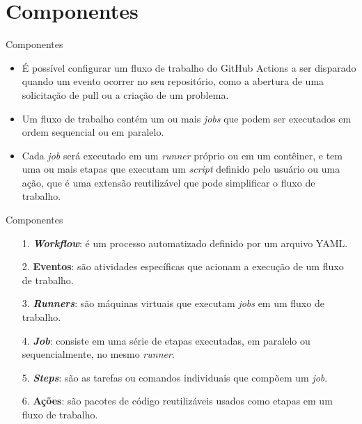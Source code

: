 \documentclass[t,serif]{beamer}
\begin{document}
\section{Componentes}
	\begin{frame}{Componentes}
		\vspace{0.5cm}
		\begin{itemize}
			\item É possível configurar um fluxo de trabalho do GitHub Actions a ser disparado quando um evento ocorrer no seu repositório, como a abertura de uma solicitação de pull ou a criação de um problema.
			\vspace{0.5cm}
			\item Um fluxo de trabalho contém um ou mais \textit{jobs} que podem ser executados em ordem sequencial ou em paralelo.
			\vspace{0.5cm}
			\item Cada \textit{job} será executado em um \textit{runner} próprio ou em um contêiner, e tem uma ou mais etapas que executam um \textit{script} definido pelo usuário ou uma ação, que é uma extensão reutilizável que pode simplificar o fluxo de trabalho.
		\end{itemize}
	\end{frame}
	
	\begin{frame}{Componentes}
		\begin{enumerate}
			\item[1.] \textbf{\textit{Workflow}}: é um processo automatizado definido por um arquivo YAML.
			\item[2.] \textbf{Eventos}: são atividades específicas que acionam a execução de um fluxo de trabalho.
			\item[3.] \textbf{\textit{Runners}}: são máquinas virtuais que executam \textit{jobs} em um fluxo de trabalho.
			\item[4.] \textbf{\textit{Job}}: consiste em uma série de etapas executadas, em paralelo ou sequencialmente, no mesmo \textit{runner}.
			\item[5.] \textbf{\textit{Steps}}: são as tarefas ou comandos individuais que compõem um \textit{job}.
			\item[6.] \textbf{Ações}: são pacotes de código reutilizáveis usados como etapas em um fluxo de trabalho.
		\end{enumerate}
	\end{frame}
	
\end{document}
